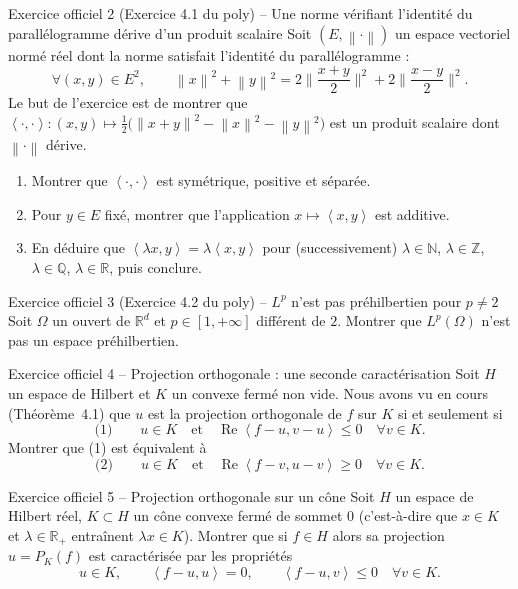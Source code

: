 \documentclass[11pt,a4paper]{article}
\newcommand{\R}{\mathbb{R}}
\newcommand{\N}{\mathbb{N}}
\newcommand{\Z}{\mathbb{Z}}
\newcommand{\Q}{\mathbb{Q}}
\newcommand{\norm}[1]{\left\|#1\right\|}
\newcommand{\ps}[2]{\left\langle #1,#2\right\rangle}
\renewcommand{\Re}{\operatorname{Re}}
\theoremstyle{definition}
\begin{document}
\begin{exo}{Exercice officiel 2 (Exercice 4.1 du poly) -- Une norme vérifiant l'identité du parallélogramme dérive d'un produit scalaire}
Soit $(E,\norm\cdot)$ un espace vectoriel normé réel dont la norme satisfait l'identité du parallélogramme :
\[
\forall(x,y)\in E^2,\qquad\norm x^2+\norm y^2=2\Big\|\frac{x+y}2\Big\|^2+2\Big\|\frac{x-y}2\Big\|^2 .
\]
Le but de l'exercice est de montrer que $\ps\cdot\cdot:(x,y)\mapsto\frac12\big(\norm{x+y}^2-\norm x^2-\norm y^2\big)$ est un produit scalaire dont $\norm\cdot$ dérive.
\begin{enumerate}[label=(\alph*)]
  \item Montrer que $\ps\cdot\cdot$ est symétrique, positive et séparée.
  \item Pour $y\in E$ fixé, montrer que l'application $x\mapsto\ps xy$ est additive.
  \item En déduire que $\ps{\lambda x}y=\lambda\ps xy$ pour (successivement) $\lambda\in\N$, $\lambda\in\Z$, $\lambda\in\Q$, $\lambda\in\R$, puis conclure.
\end{enumerate}
\end{exo}

\begin{exo}{Exercice officiel 3 (Exercice 4.2 du poly) -- $L^p$ n'est pas préhilbertien pour $p\ne2$}
Soit $\Omega$ un ouvert de $\R^d$ et $p\in[1,+\infty]$ différent de $2$. Montrer que $L^p(\Omega)$ n'est pas un espace préhilbertien.
\end{exo}

\begin{exo}{Exercice officiel 4 -- Projection orthogonale : une seconde caractérisation}
Soit $H$ un espace de Hilbert et $K$ un convexe fermé non vide. Nous avons vu en cours (Théorème~4.1) que $u$ est la projection orthogonale de $f$ sur $K$ si et seulement si
\[
\text{(1)}\qquad u\in K\quad\text{et}\quad\Re\ps{f-u}{v-u}\le0\quad\forall v\in K .
\]
Montrer que (1) est équivalent à
\[
\text{(2)}\qquad u\in K\quad\text{et}\quad\Re\ps{f-v}{u-v}\ge0\quad\forall v\in K .
\]
\end{exo}

\begin{exo}{Exercice officiel 5 -- Projection orthogonale sur un cône}
Soit $H$ un espace de Hilbert réel, $K\subset H$ un cône convexe fermé de sommet $0$ (c'est-à-dire que $x\in K$ et $\lambda\in\R_+$ entraînent $\lambda x\in K$). Montrer que si $f\in H$ alors sa projection $u=P_K(f)$ est caractérisée par les propriétés
\[
u\in K,\qquad\ps{f-u}u=0,\qquad\ps{f-u}v\le0\quad\forall v\in K .
\]
\end{exo}
\end{document}
